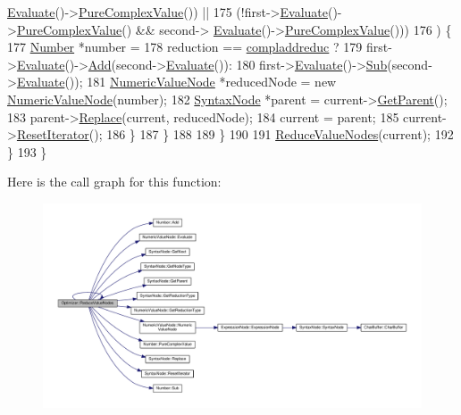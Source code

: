 \begin{DoxyCode}
      \hyperlink{classNumericValueNode_abdd2e6fd1723488a24a645fec481a971}{Evaluate}()->\hyperlink{structNumber_a037b461c2c9189c00b11f395a325735d}{PureComplexValue}()) ||
175                      (!first->\hyperlink{classNumericValueNode_abdd2e6fd1723488a24a645fec481a971}{Evaluate}()->\hyperlink{structNumber_a037b461c2c9189c00b11f395a325735d}{PureComplexValue}() && second->
      \hyperlink{classNumericValueNode_abdd2e6fd1723488a24a645fec481a971}{Evaluate}()->\hyperlink{structNumber_a037b461c2c9189c00b11f395a325735d}{PureComplexValue}()))
176                 ) \{
177                     \hyperlink{structNumber}{Number} *number =
178                         reduction == \hyperlink{nodes_8h_ab321a69ad5704b704b8dd9e1b3984a29ac930999b75ae22f50a2fa8d774a80936}{compladdreduc} ?
179                         first->\hyperlink{classNumericValueNode_abdd2e6fd1723488a24a645fec481a971}{Evaluate}()->\hyperlink{structNumber_af38172a47d725f10b8586846cb06e8a4}{Add}(second->\hyperlink{classNumericValueNode_abdd2e6fd1723488a24a645fec481a971}{Evaluate}()):
180                         first->\hyperlink{classNumericValueNode_abdd2e6fd1723488a24a645fec481a971}{Evaluate}()->\hyperlink{structNumber_ae64075f6f73ded559499d3156bde0bdb}{Sub}(second->\hyperlink{classNumericValueNode_abdd2e6fd1723488a24a645fec481a971}{Evaluate}());
181                     \hyperlink{classNumericValueNode}{NumericValueNode} *reducedNode = \textcolor{keyword}{new} 
      \hyperlink{classNumericValueNode}{NumericValueNode}(number);
182                     \hyperlink{classSyntaxNode}{SyntaxNode} *parent = current->\hyperlink{classSyntaxNode_a4a85fd710ad44edbc5b3ac625c10cd08}{GetParent}();
183                     parent->\hyperlink{classSyntaxNode_a2797ff5eb05f3a36ae1be41b70105e05}{Replace}(current, reducedNode);
184                     current = parent;
185                     current->\hyperlink{classSyntaxNode_ac51307368fb255aa760b99e137178c89}{ResetIterator}();
186                 \}
187             \}
188 
189         \}
190 
191         \hyperlink{classOptimizer_a5b45089aff3c6568f3531faa9e701f21}{ReduceValueNodes}(current);
192     \}
193 \}
\end{DoxyCode}


Here is the call graph for this function\+:\nopagebreak
\begin{figure}[H]
\begin{center}
\leavevmode
\includegraphics[width=350pt]{classOptimizer_a5b45089aff3c6568f3531faa9e701f21_cgraph}
\end{center}
\end{figure}




